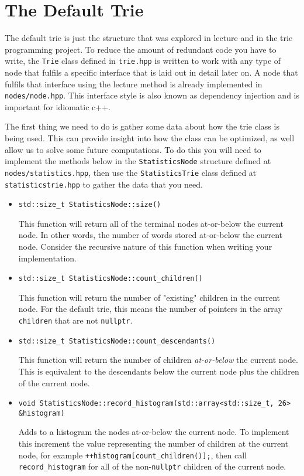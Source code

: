 \documentclass{article}
\begin{document}
\section{The Default Trie}

The default trie is just the structure that was explored in lecture and in the trie programming project. To reduce the amount of redundant code you have to write, the \verb|Trie| class defined in \verb|trie.hpp| is written to work with any type of node that fulfils a specific interface that is laid out in detail later on. A node that fulfils that interface using the lecture method is already implemented in \verb|nodes/node.hpp|. This interface style is also known as dependency injection and is important for idiomatic c++.

The first thing we need to do is gather some data about how the trie class is being used. This can provide insight into how the class can be optimized, as well allow us to solve some future computations. To do this you will need to implement the methods below in the \verb|StatisticsNode| structure defined at \verb|nodes/statistics.hpp|, then use the \verb|StatisticsTrie| class defined at \\ \verb|statisticstrie.hpp| to gather the data that you need.

\begin{itemize}
    \item \verb|std::size_t StatisticsNode::size()|

    This function will return all of the terminal nodes at-or-below the current node. In other words, the number of words stored at-or-below the current node. Consider the recursive nature of this function when writing your implementation.

    \item \verb|std::size_t StatisticsNode::count_children()|

    This function will return the number of "existing" children in the current node. For the default trie, this means the number of pointers in the array \verb|children| that are not \verb|nullptr|.

    \item \verb|std::size_t StatisticsNode::count_descendants()|

    This function will return the number of children \textit{at-or-below} the current node. This is equivalent to the descendants below the current node plus the children of the current node.

    \item \verb|void StatisticsNode::record_histogram(std::array<std::size_t, 26> &histogram)|

    Adds to a histogram the nodes at-or-below the current node. To implement this increment the value representing the number of children at the current node, for example \verb|++histogram[count_children()];|, then call \verb|record_histogram| for all of the non-\verb|nullptr| children of the current node.
\end{itemize}
\end{document}
